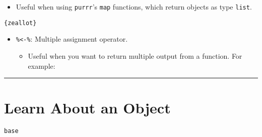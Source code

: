 \documentclass[
]{book}
\newenvironment{Shaded}{\begin{snugshade}}{\end{snugshade}}
\newcommand{\ControlFlowTok}[1]{\textcolor[rgb]{0.13,0.29,0.53}{\textbf{#1}}}
\newcommand{\DataTypeTok}[1]{\textcolor[rgb]{0.13,0.29,0.53}{#1}}
\newcommand{\KeywordTok}[1]{\textcolor[rgb]{0.13,0.29,0.53}{\textbf{#1}}}
\newcommand{\NormalTok}[1]{#1}
\newcommand{\OperatorTok}[1]{\textcolor[rgb]{0.81,0.36,0.00}{\textbf{#1}}}
\newcommand{\StringTok}[1]{\textcolor[rgb]{0.31,0.60,0.02}{#1}}
\providecommand{\tightlist}{%
  \setlength{\itemsep}{0pt}\setlength{\parskip}{0pt}}
\begin{document}
\begin{itemize}
  \begin{itemize}
  \tightlist
  \item
    Useful when using \texttt{purrr}'s \texttt{map} functions, which return objects as type \texttt{list}.
  \end{itemize}
\end{itemize}

\texttt{\{zeallot\}}

\begin{itemize}
\tightlist
\item
  \texttt{\%\textless{}-\%}: Multiple assignment operator.

  \begin{itemize}
  \tightlist
  \item
    Useful when you want to return multiple output from a function. For example:
  \end{itemize}
\end{itemize}

\begin{Shaded}
\end{Shaded}

\begin{center}\rule{0.5\linewidth}{0.5pt}\end{center}

\hypertarget{learn-about-an-object}{%
\section{Learn About an Object}\label{learn-about-an-object}}

\texttt{base}
\end{document}
